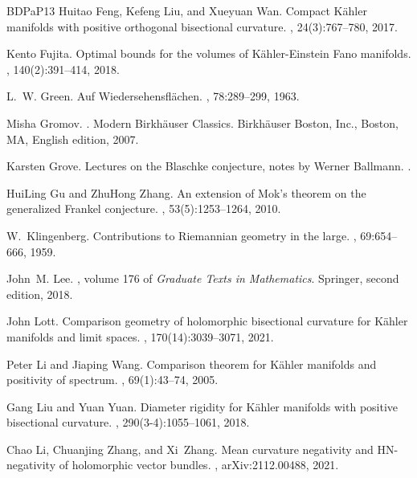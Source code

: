 \documentclass[12pt]{amsart}
\theoremstyle{plain}
\theoremstyle{definition}
\renewcommand{\>}{\rightarrow}
\numberwithin{equation}{section} %
\begin{document}
\begin{thebibliography}{BDPaP13}
		Huitao Feng, Kefeng Liu, and Xueyuan Wan.
		\newblock Compact {K}\"ahler manifolds with positive orthogonal bisectional curvature.
		, 24(3):767--780, 2017.
		
		Kento Fujita.
		\newblock Optimal bounds for the volumes of {K}\"ahler-{E}instein {F}ano manifolds.
		, 140(2):391--414, 2018.
		
		L.~W. Green.
		\newblock Auf {W}iedersehensfl\"achen.
		, 78:289--299, 1963.
		
		Misha Gromov.
		.
		\newblock Modern Birkh\"auser Classics. Birkh\"auser Boston, Inc., Boston, MA, English edition, 2007.
		
		Karsten Grove.
		\newblock Lectures on the {B}laschke conjecture, notes by {W}erner {B}allmann.
		.
		
		

		HuiLing Gu and ZhuHong Zhang.
		\newblock An extension of {M}ok's theorem on the generalized {F}rankel conjecture.
		, 53(5):1253--1264, 2010.
		
		W.~Klingenberg.
		\newblock Contributions to {R}iemannian geometry in the large.
		, 69:654--666, 1959.
		
		John~M. Lee.
		, volume 176 of {\em Graduate Texts in Mathematics}.
		\newblock Springer,  second edition, 2018.
		
		John Lott.
		\newblock Comparison geometry of holomorphic bisectional curvature for {K}\"ahler manifolds and limit spaces.
		, 170(14):3039--3071, 2021.
		
		Peter Li and Jiaping Wang.
		\newblock Comparison theorem for {K}\"ahler manifolds and positivity of spectrum.
		, 69(1):43--74, 2005.
		
		Gang Liu and Yuan Yuan.
		\newblock Diameter rigidity for {K}\"ahler manifolds with positive bisectional curvature.
		, 290(3-4):1055--1061, 2018.
		
		Chao Li, Chuanjing Zhang, and Xi~Zhang.
		\newblock Mean curvature negativity and {HN}-negativity of holomorphic vector bundles.
		, arXiv:2112.00488, 2021.


\end{thebibliography}
\end{document}
